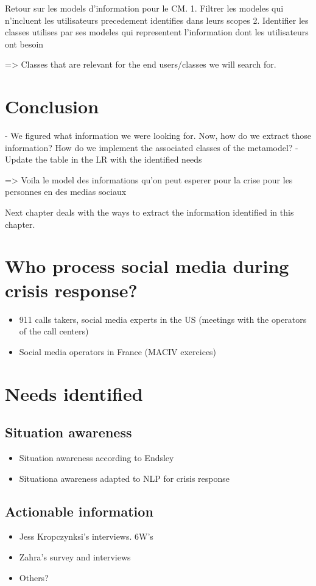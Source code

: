 Retour sur les models d'information pour le CM.
1. Filtrer les modeles qui n'incluent les utilisateurs precedement identifies dans leurs scopes
2. Identifier les classes utilises par ses modeles qui representent l'information dont les utilisateurs ont besoin

=> Classes that are relevant for the end users/classes we will search for.

\section{Conclusion}
- We figured what information we were looking for. Now, how do we extract those information? How do we implement the associated classes of the metamodel?
- Update the table in the LR with the identified needs

=> Voila le model des informations qu'on peut esperer pour la crise pour les personnes en des medias sociaux

Next chapter deals with the ways to extract the information identified in this chapter.

\section{Who process social media during crisis response?}
\begin{itemize}
    \item 911 calls takers, social media experts in the US (meetings with the operators of the call centers)
    \item Social media operators in France (MACIV exercices)
\end{itemize}

\section{Needs identified}
\subsection{Situation awareness}
\begin{itemize}
    \item Situation awareness according to Endsley
    \item Situationa awareness adapted to NLP for crisis response
\end{itemize}

\subsection{Actionable information}
\begin{itemize}
    \item Jess Kropczynksi's interviews. 6W's
    \item Zahra's survey and interviews
    \item Others?
\end{itemize}

